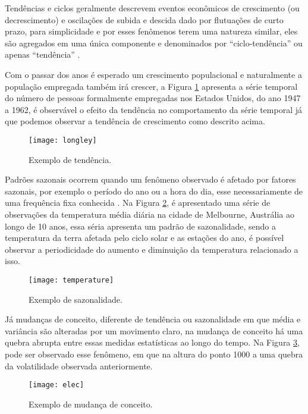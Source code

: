 Tendências e ciclos geralmente descrevem eventos econômicos de crescimento (ou
decrescimento) e oscilações de subida e descida dado por flutuações de curto
prazo, para simplicidade e por esses fenômenos terem uma natureza similar, eles
são agregados em uma única componente e denominados por ``ciclo-tendência'' ou
apenas ``tendência'' \cite{hyndman2018forecasting}.

Com o passar dos anos é esperado um crescimento populacional e naturalmente a
população empregada também irá crescer, a Figura \ref{fig:trend} apresenta a
série temporal do número de pessoas formalmente empregadas nos Estados Unidos,
do ano 1947 a 1962, é observável o efeito da tendência no comportamento da
série temporal já que podemos observar a tendência de crescimento como descrito acima.

\begin{figure}[ht]
    \centering
    \texttt{[image: longley]}
    \caption{Exemplo de tendência.}
    \label{fig:trend}
\end{figure}

Padrões sazonais ocorrem quando um fenômeno observado é afetado por fatores
sazonais, por exemplo o período do ano ou a hora do dia, esse necessariamente
de uma frequência fixa conhecida
\cite{hyndman2018forecasting,brockwell2016introduction}. Na Figura
\ref{fig:seasonality}, é apresentado uma série de observações da temperatura
média diária na cidade de Melbourne, Austrália ao longo de 10 anos, essa séria
apresenta um padrão de sazonalidade, sendo a temperatura da terra afetada pelo
ciclo solar e as estações do ano, é possível observar a periodicidade do
aumento e diminuição da temperatura relacionado a isso.

\begin{figure}[ht]
    \centering
    \texttt{[image: temperature]}
    \caption{Exemplo de sazonalidade.}
    \label{fig:seasonality}
\end{figure}

Já mudanças de conceito, diferente de tendência ou sazonalidade em que média e variância são alteradas por um movimento claro, na mudança de conceito há uma quebra abrupta entre essas medidas estatísticas ao longo do tempo. Na Figura \ref{fig:concept_drift}, pode ser observado esse fenômeno, em que na altura do ponto 1000 a uma quebra da volatilidade observada anteriormente.

\begin{figure}[ht]
    \centering
    \texttt{[image: elec]}
    \caption{Exemplo de mudança de conceito.}
    \label{fig:concept_drift}
\end{figure}


